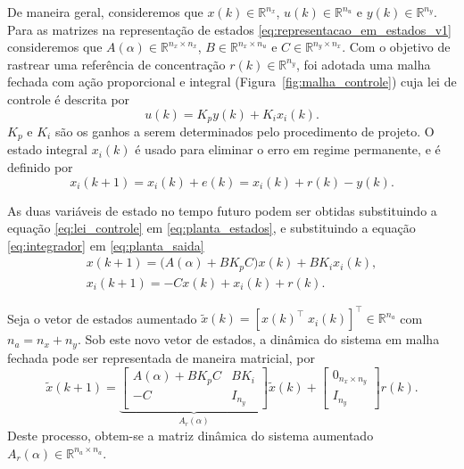 De maneira geral, consideremos que $x(k)\in\mathbb{R}^{n_x}$, $u(k)\in\mathbb{R}^{n_u}$ e $y(k)\in\mathbb{R}^{n_y}$. Para as matrizes na representação de estados \eqref{eq:representacao_em_estados_v1} consideremos que $A(\alpha)\in\mathbb{R}^{n_x\times n_x}$, $B\in\mathbb{R}^{n_x\times n_u}$ e $C\in\mathbb{R}^{n_y\times n_x}$. Com o objetivo de rastrear uma referência de concentração $r(k)\in\mathbb{R}^{n_y}$, foi adotada uma malha fechada com ação proporcional e integral (Figura~\ref{fig:malha_controle}) cuja lei de controle é descrita por
\begin{equation}
 u(k)=K_p y(k)+K_i x_i(k).
 \label{eq:lei_controle}
\end{equation}
$K_p$ e $K_i$ são os ganhos a serem determinados pelo procedimento de projeto. O estado integral $x_i(k)$ é usado para eliminar o erro em regime permanente, e é definido por
\begin{equation}
 x_i(k+1)=x_i(k)+e(k)=x_i(k)+r(k)-y(k).
 \label{eq:integrador}
\end{equation}

\noindent
As duas variáveis de estado no tempo futuro podem ser obtidas substituindo a equação \eqref{eq:lei_controle} em \eqref{eq:planta_estados}, e substituindo a equação \eqref{eq:integrador}  em \eqref{eq:planta_saida}
\begin{subequations}\label{eq:planta_fechada_completa}
    \begin{align}
        x(k+1)=\bigl(A(\alpha)+BK_pC\bigr)x(k)+BK_i x_i(k),
        \label{eq:planta_fechada}\\
        x_i(k+1)=-Cx(k)+x_i(k)+r(k).
        \label{eq:integrador_fechado}
    \end{align}
\end{subequations}

Seja o vetor de estados aumentado $\widetilde{x}(k)=[x(k)^\top\;x_i(k)]^\top\in\mathbb{R}^{n_a}$ com $n_a=n_x+n_y$. Sob este novo vetor de estados, a dinâmica do sistema em malha fechada pode ser representada de maneira matricial, por
\begin{equation}
 \widetilde{x}(k+1)=
 \underbrace{\begin{bmatrix}
 A(\alpha)+BK_pC & BK_i\\
 -C & I_{n_y}
 \end{bmatrix}}_{A_r(\alpha)}\widetilde{x}(k)
 +\begin{bmatrix}0_{n_x\times n_y}\\I_{n_y}\end{bmatrix}r(k).
 \label{eq:sistema_aumentado}
\end{equation}
\noindent
Deste processo, obtem-se a matriz dinâmica do sistema aumentado $A_r(\alpha)\in\mathbb{R}^{n_a\times n_a}$.
